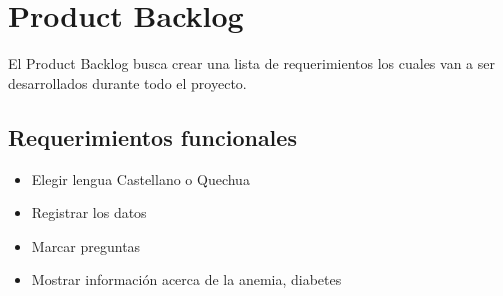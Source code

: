 \chapter{Product Backlog}
El Product Backlog busca crear una lista de requerimientos los cuales van a ser desarrollados durante todo el proyecto.
\section{Requerimientos funcionales}
\begin{itemize}
	\item Elegir lengua Castellano o Quechua
	\item Registrar los datos 
	\item Marcar preguntas
	\item Mostrar informaci\'on acerca de la anemia, diabetes
\end{itemize}

